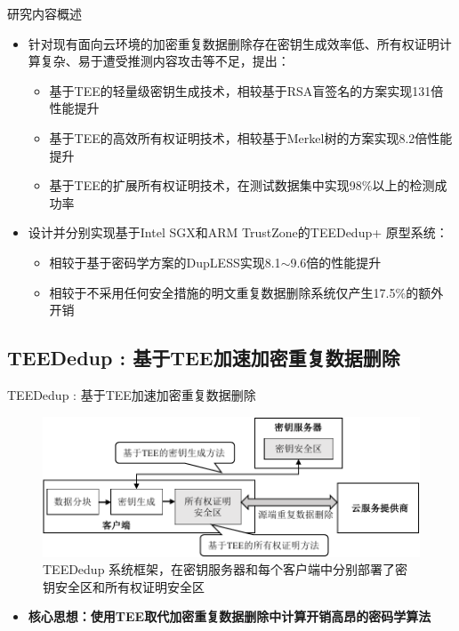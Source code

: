 \documentclass{beamer}
\newcommand{\sysnameS}{TEEDedup }
\newcommand{\prototype}{TEEDedup+ }
\begin{document}
\begin{frame}{研究内容概述}
    \begin{itemize}
        \item 针对现有面向云环境的加密重复数据删除存在密钥生成效率低、所有权证明计算复杂、易于遭受推测内容攻击等不足，提出：
              \begin{itemize}
                  \item 基于TEE的轻量级密钥生成技术，相较基于RSA盲签名的方案实现{\color{red}131倍}性能提升
                  \item 基于TEE的高效所有权证明技术，相较基于Merkel树的方案实现{\color{red}8.2倍}性能提升
                  \item 基于TEE的扩展所有权证明技术，在测试数据集中实现{\color{red}98\%}以上的检测成功率
              \end{itemize}
    \end{itemize}
    \begin{itemize}
        \item 设计并分别实现基于Intel SGX和ARM TrustZone的\prototype 原型系统：
              \begin{itemize}
                  \item 相较于基于密码学方案的DupLESS实现{\color{red}8.1$\sim$9.6倍}的性能提升
                  \item 相较于不采用任何安全措施的明文重复数据删除系统仅产生{\color{red}17.5\%}的额外开销
              \end{itemize}
    \end{itemize}
\end{frame}

\subsection{\sysnameS: 基于TEE加速加密重复数据删除}

\begin{frame}{\sysnameS: 基于TEE加速加密重复数据删除}
    \begin{figure}[!htb]
        \centering
        \includegraphics[width=\linewidth]{../pic/sgxdedup/sgxdedup-arch.pdf}
        \caption{\sysnameS 系统框架，在密钥服务器和每个客户端中分别部署了密钥安全区和所有权证明安全区}
        \label{fig:sgxdedup-overview}
    \end{figure}
    \vspace{-1em}
    \begin{itemize}
        \item  {\bf 核心思想：使用TEE取代加密重复数据删除中计算开销高昂的密码学算法}
    \end{itemize}
\end{frame}
\end{document}
